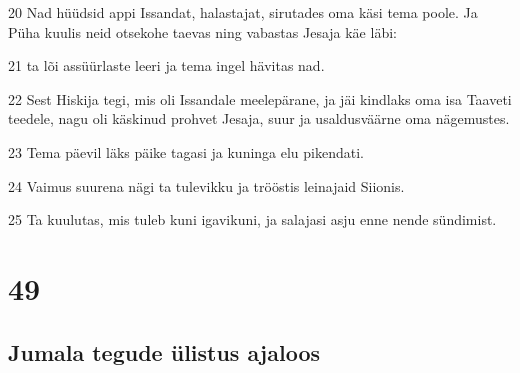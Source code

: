 \par 20 Nad hüüdsid appi Issandat, halastajat, sirutades oma käsi tema poole. Ja Püha kuulis neid otsekohe taevas ning vabastas Jesaja käe läbi:
\par 21 ta lõi assüürlaste leeri ja tema ingel hävitas nad.
\par 22 Sest Hiskija tegi, mis oli Issandale meelepärane, ja jäi kindlaks oma isa Taaveti teedele, nagu oli käskinud prohvet Jesaja, suur ja usaldusväärne oma nägemustes.
\par 23 Tema päevil läks päike tagasi ja kuninga elu pikendati.
\par 24 Vaimus suurena nägi ta tulevikku ja trööstis leinajaid Siionis.
\par 25 Ta kuulutas, mis tuleb kuni igavikuni, ja salajasi asju enne nende sündimist.

\chapter{49}

\section*{Jumala tegude ülistus ajaloos}

